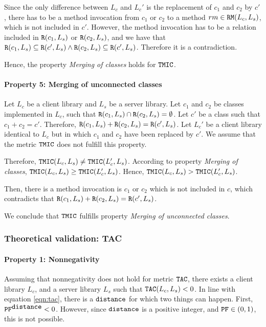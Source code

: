 Since the only difference between $L_c$ and $L_c'$ is the replacement of $c_1$ and $c_2$ by $c'$, there has to be a method invocation from $c_1$ or $c_2$ to a method $rm \in \verb|RM|(L_c,L_s)$, which is not included in $c'$. However, the method invocation has to be a relation included in $\verb|R|(c_1, L_s)$ or $\verb|R|(c_2, L_s)$, and we have that $\verb|R|(c_1, L_s) \subseteq \verb|R|(c', L_s) \land \verb|R|(c_2, L_s) \subseteq \verb|R|(c', L_s)$. Therefore it is a contradiction.

Hence, the property \textit{Merging of classes} holds for $\verb|TMIC|$.

\paragraph{Property 5: Merging of unconnected classes}
Let $L_c$ be a client library and $L_s$ be a server library. Let $c_1$ and $c_2$ be classes implemented in $L_c$, such that $\verb|R|(c_1, L_s) \cap \verb|R|(c_2, L_s) = \emptyset$. Let $c'$ be a class such that $c_1 + c_2 = c'$. Therefore, $\verb|R|(c_1, L_s) + \verb|R|(c_2, L_s) = \verb|R|(c', L_s)$. Let $L_c'$ be a client library identical to $L_c$ but in which $c_1$ and $c_2$ have been replaced by $c'$. We assume that the metric $\verb|TMIC|$ does not fulfill this property.

Therefore, $\verb|TMIC|(L_c, L_s) \neq \verb|TMIC|(L_c', L_s)$. According to property \textit{Merging of classes}, $\verb|TMIC|(L_c, L_s) \geq \verb|TMIC|(L_c', L_s)$. Hence, $\verb|TMIC|(L_c, L_s) > \verb|TMIC|(L_c', L_s)$.

Then, there is a method invocation is $c_1$ or $c_2$ which is not included in $c$, which contradicts that $\verb|R|(c_1, L_s) + \verb|R|(c_2, L_s) = \verb|R|(c', L_s)$.

We conclude that $\verb|TMIC|$ fulfills property \textit{Merging of unconnected classes}.

\subsubsection{Theoretical validation: TAC}

\paragraph{Property 1: Nonnegativity}
Assuming that nonnegativity does not hold for metric $\verb|TAC|$, there exists a client library $L_c$, and a server library $L_s$ such that $\verb|TAC|(L_c, L_s) < 0$. In line with equation \ref{eqn:tac}, there is a $\verb|distance|$ for which two things can happen. First, $\verb|PF|^{\verb|distance|} < 0$. However, since $\verb|distance|$ is a positive integer, and $\verb|PF| \in (0,1)$, this is not possible.

